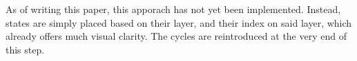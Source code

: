 As of writing this paper, this apporach has not yet been implemented. Instead, states are simply placed based on their layer, and their index on said layer, which already offers much visual clarity. The cycles are reintroduced at the very end of this step.



